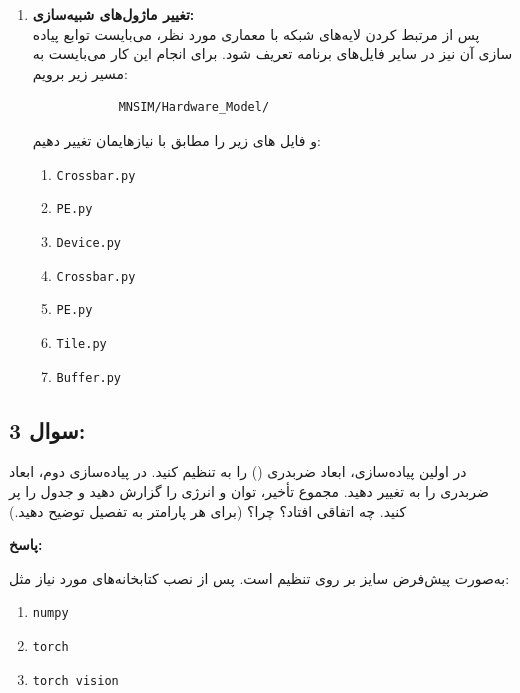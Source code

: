 \documentclass[12pt]{exam}
\begin{document}
\begin{questions}
\begin{enumerate}
	
	\item \textbf{تغییر ماژول‌های شبیه‌سازی:}\\
	
	پس از مرتبط کردن لایه‌های شبکه با معماری  مورد نظر، می‌بایست توابع پیاده سازی آن نیز در سایر فایل‌های برنامه تعریف شود. برای انجام این کار می‌بایست به مسیر زیر برویم:
	
	\begin{latin}
		\begin{verbatim}
			MNSIM/Hardware_Model/ 
		\end{verbatim} 
	\end{latin}
	
	و فایل های زیر را مطابق با نیاز‌هایمان تغییر دهیم:
	\begin{latin}
		\begin{enumerate}
			\item \texttt{Crossbar.py}
			\item \texttt{PE.py}
			\item \texttt{Device.py}
			\item \texttt{Crossbar.py}
			\item \texttt{PE.py}
			\item \texttt{Tile.py}
			\item \texttt{Buffer.py}
		\end{enumerate} 
	\end{latin}
\end{enumerate}
	
	
	
	
	
	
\subsection*{سوال 3:}
	
در اولین پیاده‌سازی، ابعاد ضربدری () را به  تنظیم کنید. در پیاده‌سازی دوم، ابعاد ضربدری را به  تغییر دهید. مجموع تأخیر، توان و انرژی را گزارش دهید و جدول را پر کنید. چه اتفاقی افتاد؟ چرا؟ (برای هر پارامتر به تفصیل توضیح دهید.)


\textbf{پاسخ: }

به‌صورت پیش‌فرض  سایز بر روی  تنظیم است. پس از نصب کتابخانه‌های مورد نیاز مثل:


\begin{latin}
	\begin{enumerate}
		\item \texttt{numpy}
		\item \texttt{torch}
		\item \texttt{torch vision}
	\end{enumerate}
\end{latin}


\end{questions}
\end{document}
